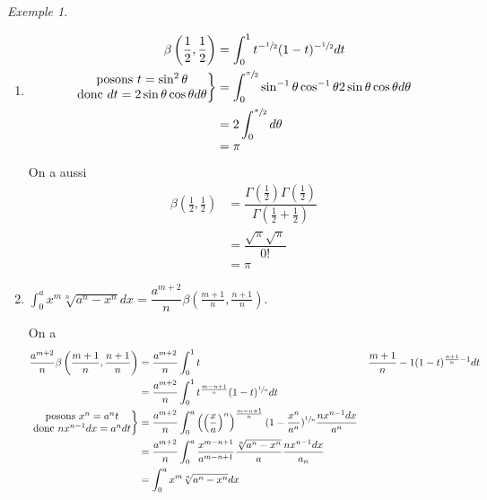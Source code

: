 \documentclass{report}
\newcommand*{\dint}[3]{\displaystyle\int_{#1}^{#2}#3}
\theoremstyle{definition}
\theoremstyle{remark}
\newtheorem*{exem}{Exemple}
\begin{document}
	\begin{exem}~

		\begin{enumerate}[label=\alph*)]
			\item
			\begin{align*}
				\beta\left( \frac{1}{2}, \frac{1}{2} \right)&= \dint{0}{1}{t^{-\sfrac{1}{2}} (1-t)^{-\sfrac{1}{2}} dt}\\
				\left.\begin{matrix}
					\text{posons } t=\sin^2\theta\\
					\text{donc } dt=2\sin\theta \cos\theta d\theta
				\end{matrix}\right\}&= \dint{0}{\sfrac{\pi}{2}}{\sin^{-1}\theta \cos^{-1}\theta 2\sin\theta\cos\theta d\theta}\\
				&= 2\dint{0}{\sfrac{\pi}{2}}{d\theta}\\
				&= \pi
			\end{align*}

			On a aussi
			\begin{align*}
				\beta(\frac{1}{2}, \frac{1}{2})&= \dfrac{\Gamma(\frac{1}{2}) \Gamma(\frac{1}{2})}{\Gamma(\frac{1}{2} + \frac{1}{2})}\\
				&= \dfrac{\sqrt{\pi}\sqrt{\pi}}{0!}\\
				&= \pi
			\end{align*}
			\item $\dint{0}{a}{x^m\sqrt[n]{a^n-x^n} dx} = \dfrac{a^{m+2}}{n} \beta\left( \frac{m+1}{n}, \frac{n+1}{n} \right)$.

			On a
			\begin{align*}
				\dfrac{a^{m+2}}{n}\beta\left( \frac{m+1}{n}, \frac{n+1}{n} \right)&= \dfrac{a^{m+2}}{n} \dint{0}{1}{t&{\frac{m+1}{n}-1} (1-t)^{\frac{n+1}{n}-1} dt}\\
				&= \dfrac{a^{m+2}}{n} \dint{0}{1}{t^{\frac{m-n+1}{n}} (1-t)^{\sfrac{1}{n}} dt}\\
				\left.\begin{matrix}
					\text{posons } x^n=a^nt\\
					\text{donc } nx^{n-1}dx=a^ndt
				\end{matrix}\right\}&= \dfrac{a^{m+2}}{n} \dint{0}{a}{\left( \left( \frac{x}{a} \right)^n \right)^{\frac{m-n+1}{n}} (1-\frac{x^n}{a^n})^{\sfrac{1}{n}} \frac{nx^{n-1} dx}{a^n}}\\
				&= \dfrac{a^{m+2}}{n} \dint{0}{a}{\dfrac{x^{m-n+1}}{a^{m-n+1}} \dfrac{\sqrt[n]{a^n-x^n}}{a} \dfrac{nx^{n-1}dx}{a_n}}\\
				&= \dint{0}{a}{x^m \sqrt[n]{a^n-x^n} dx}
			\end{align*}


\end{enumerate}
\end{exem}
\end{document}
